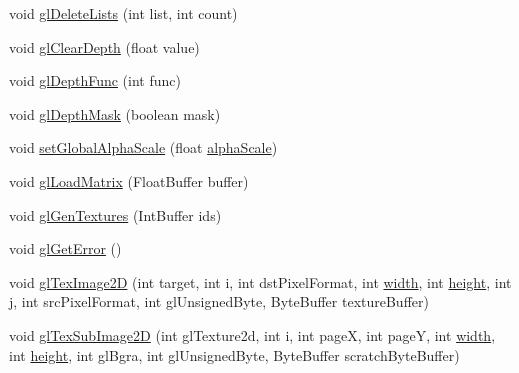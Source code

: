\begin{DoxyCompactItemize}
void \mbox{\hyperlink{classorg_1_1newdawn_1_1slick_1_1opengl_1_1renderer_1_1_immediate_mode_o_g_l_renderer_a47e9f1e741fe05b4649ecdb92bd2d119}{gl\+Delete\+Lists}} (int list, int count)
\item 
void \mbox{\hyperlink{classorg_1_1newdawn_1_1slick_1_1opengl_1_1renderer_1_1_immediate_mode_o_g_l_renderer_a00cacf4aac9d008657c1be3c9df5da90}{gl\+Clear\+Depth}} (float value)
\item 
void \mbox{\hyperlink{classorg_1_1newdawn_1_1slick_1_1opengl_1_1renderer_1_1_immediate_mode_o_g_l_renderer_ac17c1e89d64197a6541946906de1c663}{gl\+Depth\+Func}} (int func)
\item 
void \mbox{\hyperlink{classorg_1_1newdawn_1_1slick_1_1opengl_1_1renderer_1_1_immediate_mode_o_g_l_renderer_abb07babee3701b419044d3e74d16c700}{gl\+Depth\+Mask}} (boolean mask)
\item 
void \mbox{\hyperlink{classorg_1_1newdawn_1_1slick_1_1opengl_1_1renderer_1_1_immediate_mode_o_g_l_renderer_aba41105ecb243a2b925de16fed27abb4}{set\+Global\+Alpha\+Scale}} (float \mbox{\hyperlink{classorg_1_1newdawn_1_1slick_1_1opengl_1_1renderer_1_1_immediate_mode_o_g_l_renderer_aa1772629fe3d1481ba6b0688fedcfb23}{alpha\+Scale}})
\item 
void \mbox{\hyperlink{classorg_1_1newdawn_1_1slick_1_1opengl_1_1renderer_1_1_immediate_mode_o_g_l_renderer_a582d55ee56e4f27c61484c155406755c}{gl\+Load\+Matrix}} (Float\+Buffer buffer)
\item 
void \mbox{\hyperlink{classorg_1_1newdawn_1_1slick_1_1opengl_1_1renderer_1_1_immediate_mode_o_g_l_renderer_a15e8cc47f15d46863da6e839bcffd6f4}{gl\+Gen\+Textures}} (Int\+Buffer ids)
\item 
void \mbox{\hyperlink{classorg_1_1newdawn_1_1slick_1_1opengl_1_1renderer_1_1_immediate_mode_o_g_l_renderer_a54006e3c777d249f21efc1cfa1b8dad3}{gl\+Get\+Error}} ()
\item 
void \mbox{\hyperlink{classorg_1_1newdawn_1_1slick_1_1opengl_1_1renderer_1_1_immediate_mode_o_g_l_renderer_a3d04632d475991ab931c7176665ac9bf}{gl\+Tex\+Image2D}} (int target, int i, int dst\+Pixel\+Format, int \mbox{\hyperlink{classorg_1_1newdawn_1_1slick_1_1opengl_1_1renderer_1_1_immediate_mode_o_g_l_renderer_a65d0a04d747368ea954f69074d9102d6}{width}}, int \mbox{\hyperlink{classorg_1_1newdawn_1_1slick_1_1opengl_1_1renderer_1_1_immediate_mode_o_g_l_renderer_aec68994a0ee3b7b478122af823c8a8d7}{height}}, int j, int src\+Pixel\+Format, int gl\+Unsigned\+Byte, Byte\+Buffer texture\+Buffer)
\item 
void \mbox{\hyperlink{classorg_1_1newdawn_1_1slick_1_1opengl_1_1renderer_1_1_immediate_mode_o_g_l_renderer_af4bdc1ec15d3ade7362acde620a7471b}{gl\+Tex\+Sub\+Image2D}} (int gl\+Texture2d, int i, int pageX, int pageY, int \mbox{\hyperlink{classorg_1_1newdawn_1_1slick_1_1opengl_1_1renderer_1_1_immediate_mode_o_g_l_renderer_a65d0a04d747368ea954f69074d9102d6}{width}}, int \mbox{\hyperlink{classorg_1_1newdawn_1_1slick_1_1opengl_1_1renderer_1_1_immediate_mode_o_g_l_renderer_aec68994a0ee3b7b478122af823c8a8d7}{height}}, int gl\+Bgra, int gl\+Unsigned\+Byte, Byte\+Buffer scratch\+Byte\+Buffer)

\end{DoxyCompactItemize}
